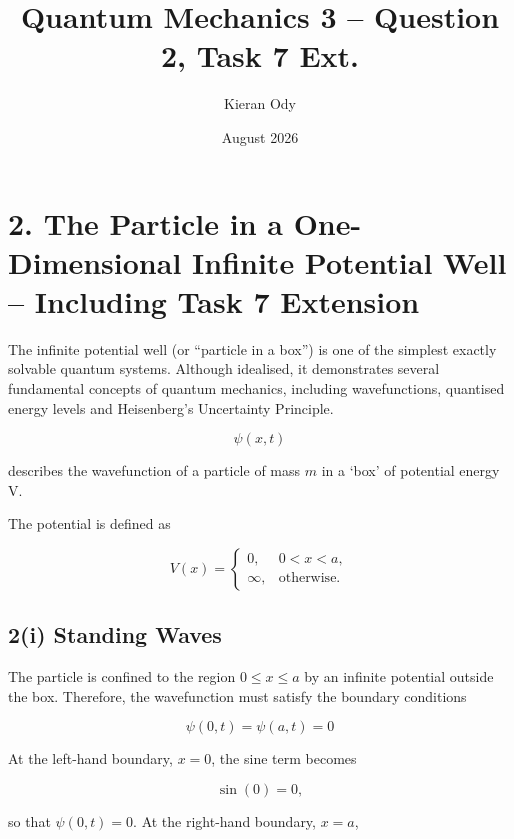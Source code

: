 \documentclass{article}
\title{Quantum Mechanics 3 -- Question 2, Task 7 Ext.}
\author{Kieran Ody}
\date{August 2026}
\begin{document}
\maketitle

\section*{2. The Particle in a One-Dimensional Infinite Potential Well -- Including Task 7 Extension}

The infinite potential well (or ``particle in a box'') is one of the simplest exactly solvable quantum systems. Although idealised, it demonstrates several fundamental concepts of quantum mechanics, including wavefunctions, quantised energy levels and Heisenberg's Uncertainty Principle.

\begin{equation*}
\psi(x,t)
\end{equation*}

describes the wavefunction of a particle of mass $m$ in a `box' of potential energy V.

\vspace{1\baselineskip}

The potential is defined as

\begin{equation*}
V(x)=
\begin{cases}
0, & 0<x<a,\\
\infty, & \text{otherwise}.
\end{cases}
\end{equation*}


\subsection*{2(i) Standing Waves}

The particle is confined to the region $0\leq x\leq a$ by an
infinite potential outside the box. Therefore, the wavefunction
must satisfy the boundary conditions

\begin{equation*}
\psi(0,t)=\psi(a,t)=0
\end{equation*}

At the left-hand boundary, $x=0$, the sine term becomes

\begin{equation*}
\sin(0)=0,
\end{equation*}

so that $\psi(0,t)=0$. At the right-hand boundary, $x=a$,
\end{document}
